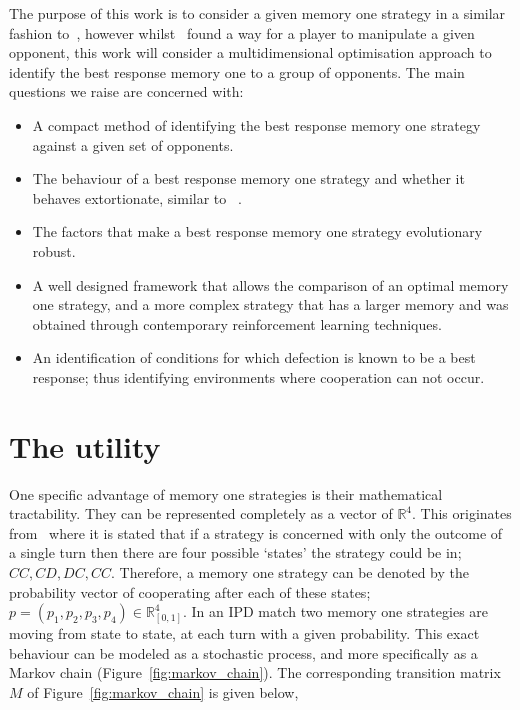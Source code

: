 \documentclass[10pt]{article}
\newcommand{\R}{\mathbb{R}}
\begin{document}
The purpose of this work is to consider a given memory one strategy in a similar
fashion to~\cite{Press2012}, however whilst~\cite{Press2012} found a way for a
player to manipulate a given opponent, this work will consider a
multidimensional optimisation approach to identify the best response memory one
to a group of opponents. The main questions we raise are concerned with:

\begin{itemize}
    \item A compact method of identifying the best response memory one strategy
    against a given set of opponents.
    \item The behaviour of a best response memory one strategy and whether it
    behaves extortionate, similar to ~\cite{Press2012}.
    \item The factors that make a best response memory one strategy evolutionary
    robust.
    \item A well designed framework that allows the comparison of an optimal memory
          one strategy, and a more complex strategy that has a larger memory and
          was obtained through contemporary reinforcement learning techniques.
    \item An identification of conditions for which defection is known to be
    a best response; thus identifying environments where cooperation can
    not occur.
\end{itemize}

\section{The utility}\label{section:utility}

One specific advantage of memory one strategies is their mathematical
tractability. They can be represented completely as a vector of \(\R^{4}\). This
originates from~\cite{Nowak1989} where it is stated that if a strategy is
concerned with only the outcome of a single turn then there are four possible
`states' the strategy could be in; \(CC, CD, DC,CC\). Therefore, a memory one
strategy can be denoted by the probability vector of cooperating after each of
these states; \(p=(p_1, p_2, p_3, p_4) \in \R_{[0,1]} ^ 4\). In an IPD match two
memory one strategies are moving from state to state, at each turn with a given
probability. This exact behaviour can be modeled as a stochastic process, and
more specifically as a Markov chain (Figure~\ref{fig:markov_chain}). The
corresponding transition matrix \(M\) of Figure~\ref{fig:markov_chain} is given
below,
\end{document}
